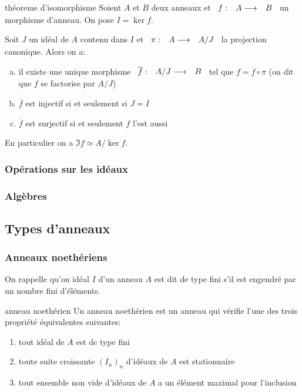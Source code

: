 \begin{theorem}{théoreme d'isomorphisme}{}
    Soient $A$ et $B$ deux anneaux et $\begin{array}[t]{ccc}f : & A \longrightarrow & B\end{array}$ un morphisme d'anneau.
    On pose $I = \ker{f}$.

    Soit $J$ un idéal de $A$ contenu dans $I$ et $\begin{array}[t]{ccc}\pi : & A \longrightarrow & A/J\end{array}$ la projection canonique. Alors on a:
    \begin{enumerate}[(a)]
        \item il existe une unique morphisme $\begin{array}[t]{ccc}\overline{f} : & A/J \longrightarrow & B\end{array}$ tel que $f = \overline{f} \circ \pi$
                (on dit que $f$ se factorise par $A/J$)
        \item $\overline{f}$ est injectif si et seulement si $J = I$
        \item $\overline{f}$ est surjectif si et seulement $f$ l'est aussi
    \end{enumerate}

    En particulier on a $\Im{f} \simeq A/\ker{f}$.
\end{theorem}

\subsubsection{Opérations sur les idéaux}

\subsubsection{Algèbres}




\subsection{Types d'anneaux}

\subsubsection{Anneaux noethériens}

On rappelle qu'on idéal $I$ d'un anneau $A$ est dit de type fini s'il est engendré par un nombre fini d'éléments.

\begin{definition}{anneau noethérien}{}
    Un anneau noethérien est un anneau qui vérifie l'une des trois propriété équivalentes suivantes:
    \begin{enumerate}[(1)]
        \item tout idéal de $A$ est de type fini
        \item toute suite croissante $(I_n)_n$ d'idéaux de $A$ est stationnaire
        \item tout ensemble non vide d'idéaux de $A$ a un élément maximal pour l'inclusion
    \end{enumerate}
\end{definition}


